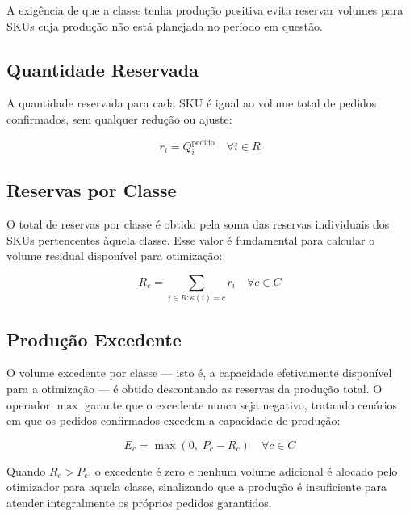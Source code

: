 \documentclass[11pt,a4paper]{article}
\begin{document}
A exigência de que a classe tenha produção positiva evita reservar volumes para
SKUs cuja produção não está planejada no período em questão.

\subsection{Quantidade Reservada}

A quantidade reservada para cada SKU é igual ao volume total de pedidos
confirmados, sem qualquer redução ou ajuste:

\begin{equation}\label{eq:auto:018}
r_i = Q_i^{\text{pedido}} \quad \forall i \in R
\end{equation}

\subsection{Reservas por Classe}

O total de reservas por classe é obtido pela soma das reservas individuais dos
SKUs pertencentes àquela classe. Esse valor é fundamental para calcular o
volume residual disponível para otimização:

\begin{equation}\label{eq:auto:019}
R_c = \sum_{i \in R : \kappa(i) = c} r_i \quad \forall c \in C
\end{equation}

\subsection{Produção Excedente}

O volume excedente por classe --- isto é, a capacidade efetivamente disponível
para a otimização --- é obtido descontando as reservas da produção total.
O operador $\max$ garante que o excedente nunca seja negativo, tratando
cenários em que os pedidos confirmados excedem a capacidade de produção:

\begin{equation}\label{eq:auto:020}
E_c = \max(0, \; P_c - R_c) \quad \forall c \in C
\end{equation}

Quando $R_c > P_c$, o excedente é zero e nenhum volume adicional é alocado
pelo otimizador para aquela classe, sinalizando que a produção é insuficiente
para atender integralmente os próprios pedidos garantidos.

\end{document}
